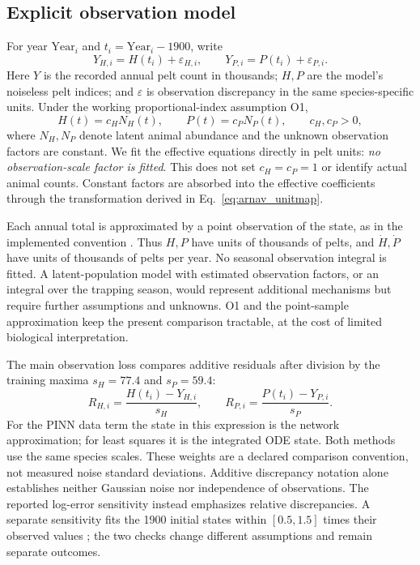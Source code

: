 \subsection{Explicit observation model}
For year $\mathrm{Year}_i$ and $t_i=\mathrm{Year}_i-1900$, write
\begin{equation}\label{eq:arnav_observation}
Y_{H,i}=H(t_i)+\varepsilon_{H,i},\qquad
Y_{P,i}=P(t_i)+\varepsilon_{P,i}.
\end{equation}
Here $Y$ is the recorded annual pelt count in thousands; $H,P$ are the model's
noiseless pelt indices; and $\varepsilon$ is observation discrepancy in the same
species-specific units. Under the working proportional-index assumption O1,
\begin{equation}\label{eq:arnav_O1}
H(t)=c_H N_H(t),\qquad P(t)=c_P N_P(t),\qquad c_H,c_P>0,
\end{equation}
where $N_H,N_P$ denote latent animal abundance and the unknown observation factors
are constant. We fit the effective equations directly in pelt units:
\emph{no observation-scale factor is fitted}. This does not set $c_H=c_P=1$ or
identify actual animal counts. Constant factors are absorbed into the effective
coefficients through the transformation derived in Eq.~\eqref{eq:arnav_unitmap}.

Each annual total is approximated by a point observation of the state, as in the
implemented convention \cite{arnav_advay2026,arnav_historical2026}. Thus $H,P$ have
units of thousands of pelts, and $\dot H,\dot P$ have units of thousands of pelts
per year. No seasonal observation integral is fitted. A latent-population model
with estimated observation factors, or an integral over the trapping season,
would represent additional mechanisms but require further assumptions and
unknowns. O1 and the point-sample approximation keep the present comparison
tractable, at the cost of limited biological interpretation.

The main observation loss compares additive residuals after division by the
training maxima $s_H=77.4$ and $s_P=59.4$:
\begin{equation}\label{eq:arnav_obsresidual}
R_{H,i}=\frac{H(t_i)-Y_{H,i}}{s_H},\qquad
R_{P,i}=\frac{P(t_i)-Y_{P,i}}{s_P}.
\end{equation}
For the PINN data term the state in this expression is the network approximation;
for least squares it is the integrated ODE state. Both methods use the same
species scales. These weights are a declared comparison convention, not measured
noise standard deviations. Additive discrepancy notation alone establishes
neither Gaussian noise nor independence of observations. The reported log-error
sensitivity instead emphasizes relative discrepancies. A separate sensitivity
fits the 1900 initial states within $[0.5,1.5]$ times their observed values
\cite{arnav_historical2026}; the two checks change different assumptions and
remain separate outcomes.

